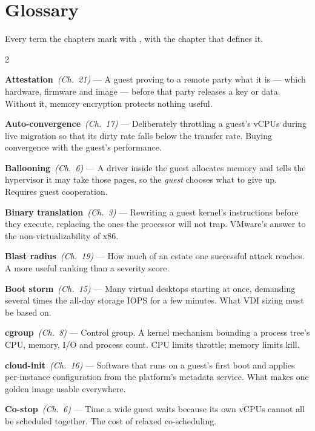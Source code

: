 \chapter{Glossary}\label{app:glossary}
\normalfigures

Every term the chapters mark with , with the chapter that
defines it.

\newcommand{\gt}[3]{\textbf{#1}~{\small\textit{(Ch.~#2)}} --- #3\par\smallskip}

\begin{multicols}{2}
\small

\gt{Attestation}{21}{A guest proving to a remote party what it is --- which
hardware, firmware and image --- before that party releases a key or data.
Without it, memory encryption protects nothing useful.}

\gt{Auto-convergence}{17}{Deliberately throttling a guest's vCPUs during live
migration so that its dirty rate falls below the transfer rate. Buying
convergence with the guest's performance.}

\gt{Ballooning}{6}{A driver inside the guest allocates memory and tells the
hypervisor it may take those pages, so the \emph{guest} chooses what to give
up. Requires guest cooperation.}

\gt{Binary translation}{3}{Rewriting a guest kernel's instructions before they
execute, replacing the ones the processor will not trap. VMware's answer to the
non-virtualizability of x86.}

\gt{Blast radius}{19}{How much of an estate one successful attack reaches. A
more useful ranking than a severity score.}

\gt{Boot storm}{15}{Many virtual desktops starting at once, demanding several
times the all-day storage IOPS for a few minutes. What VDI sizing must be based
on.}

\gt{cgroup}{8}{Control group. A kernel mechanism bounding a process tree's CPU,
memory, I/O and process count. CPU limits throttle; memory limits kill.}

\gt{cloud-init}{16}{Software that runs on a guest's first boot and applies
per-instance configuration from the platform's metadata service. What makes one
golden image usable everywhere.}

\gt{Co-stop}{6}{Time a wide guest waits because its own vCPUs cannot all be
scheduled together. The cost of relaxed co-scheduling.}


\end{multicols}
